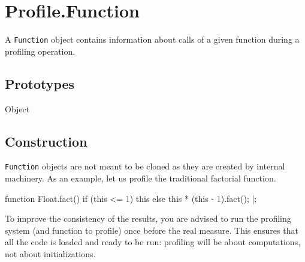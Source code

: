 
\section{Profile.Function}

A \lstinline|Function| object contains information about calls of a
given function during a profiling operation.

\subsection{Prototypes}

\begin{refObjects}
\item[Object]
\end{refObjects}

\subsection{Construction}

\lstinline|Function| objects are not meant to be cloned as they are created
by  internal machinery.  As an example, let us
profile the traditional factorial function.

\begin{urbiscript}
function Float.fact()
{
  if (this <= 1)
    this
  else
    this * (this - 1).fact();
}|;
\end{urbiscript}

To improve the consistency of the results, you are advised to run the
profiling system (and function to profile) once before the real measure.
This ensures that all the code is loaded and ready to be run: profiling will
be about computations, not about initializations.

